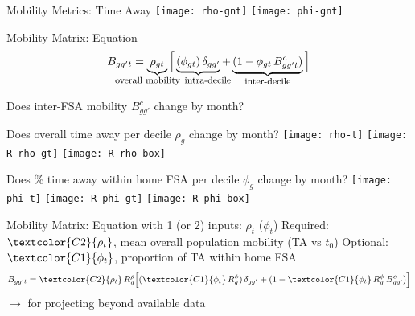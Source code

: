 \begin{frame}{Mobility Metrics: Time Away}
  \centering
  \texttt{[image: rho-gnt]}
  \texttt{[image: phi-gnt]}
\end{frame}
\begin{frame}{Mobility Matrix: Equation}
  \begin{equation*}
    B_{gg't} = 
      \ulabel{\rho_{gt}}{overall mobility\quad\quad} \Big[
      \ulabel{(\phi_{gt})\,\delta_{gg'}}{\quad\quad intra-decile} +
      \ulabel{(1-\phi_{gt}\,B^c_{gg't})}{inter-decile}
    \Big]
  \end{equation*}
\end{frame}
\begin{frame}{Does inter-FSA mobility $B^c_{gg'}$ change by month?}
\end{frame}
\begin{frame}{Does overall time away per decile $\rho_g$ change by month?}
  \centering
  \texttt{[image: rho-t]}%
  \texttt{[image: R-rho-gt]}%
  \texttt{[image: R-rho-box]}
\end{frame}
\begin{frame}{Does \% time away within home FSA per decile $\phi_g$ change by month?}
  \centering
  \texttt{[image: phi-t]}%
  \texttt{[image: R-phi-gt]}%
  \texttt{[image: R-phi-box]}
\end{frame}
\begin{frame}{Mobility Matrix: Equation with 1 (or 2) inputs: $\rho_{t}$ ($\phi_{t}$)}
  Required: $\textcolor{C2}{\rho_{t}}$, mean overall population mobility (TA vs $t_0$)
  \medpar
  Optional: $\textcolor{C1}{\phi_{t}}$, proportion of TA within home FSA
  \bigpar
  \begin{equation*}
    B_{gg't} = 
    \textcolor{C2}{\rho_{t}} \, R^{\rho}_{g} \Big[
    (\textcolor{C1}{\phi_{t}} \, R^{\phi}_{g})\,\delta_{gg'} +
    (1-\textcolor{C1}{\phi_{t}} \, R^{\phi}_{g}\,B^c_{gg'})
    \Big]
  \end{equation*}
  \bigpar
  $\rightarrow$ for projecting beyond available data
\end{frame}
